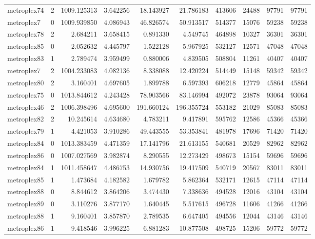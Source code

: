 \begin{longtable}{|l|r|r|r|r|r|r|r|r|r|}
metroplex74 & 2 & 1009.125313 & 3.642256 & 18.143927 & 21.786183 & 413606 & 24488 & 97791 & 97791 \\
metroplex7 & 0 & 1009.939850 & 4.086943 & 46.826574 & 50.913517 & 514377 & 15076 & 59238 & 59238 \\
metroplex78 & 2 & 2.684211 & 3.658415 & 0.891330 & 4.549745 & 464898 & 10327 & 36301 & 36301 \\
metroplex85 & 0 & 2.052632 & 4.445797 & 1.522128 & 5.967925 & 532127 & 12571 & 47048 & 47048 \\
metroplex83 & 1 & 2.789474 & 3.959499 & 0.880006 & 4.839505 & 508804 & 11261 & 40407 & 40407 \\
metroplex7 & 2 & 1004.233083 & 4.082136 & 8.338088 & 12.420224 & 514449 & 15148 & 59342 & 59342 \\
metroplex80 & 2 & 3.160401 & 4.697605 & 1.899788 & 6.597393 & 606218 & 12779 & 45864 & 45864 \\
metroplex75 & 0 & 1013.844612 & 4.243428 & 78.903566 & 83.146994 & 492072 & 23878 & 93064 & 93064 \\
metroplex46 & 2 & 1006.398496 & 4.695600 & 191.660124 & 196.355724 & 553182 & 21029 & 85083 & 85083 \\
metroplex82 & 2 & 10.245614 & 4.634680 & 4.783211 & 9.417891 & 595762 & 12586 & 45366 & 45366 \\
metroplex79 & 1 & 4.421053 & 3.910286 & 49.443555 & 53.353841 & 481978 & 17696 & 71420 & 71420 \\
metroplex84 & 0 & 1013.383459 & 4.471359 & 17.141796 & 21.613155 & 540681 & 20529 & 82962 & 82962 \\
metroplex86 & 0 & 1007.027569 & 3.982874 & 8.290555 & 12.273429 & 498673 & 15154 & 59696 & 59696 \\
metroplex84 & 1 & 1011.458647 & 4.486753 & 14.930756 & 19.417509 & 540719 & 20567 & 83011 & 83011 \\
metroplex85 & 1 & 1.473684 & 4.182582 & 1.679782 & 5.862364 & 532171 & 12615 & 47114 & 47114 \\
metroplex88 & 0 & 8.844612 & 3.864206 & 3.474430 & 7.338636 & 494528 & 12016 & 43104 & 43104 \\
metroplex89 & 0 & 3.110276 & 3.877170 & 1.640445 & 5.517615 & 496728 & 11606 & 41266 & 41266 \\
metroplex88 & 1 & 9.160401 & 3.857870 & 2.789535 & 6.647405 & 494556 & 12044 & 43146 & 43146 \\
metroplex86 & 1 & 9.418546 & 3.996225 & 6.881283 & 10.877508 & 498725 & 15206 & 59772 & 59772 \\

\end{longtable}
